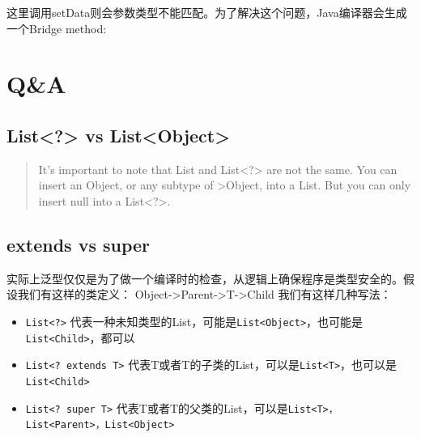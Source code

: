 \documentclass[12pt]{article}
\begin{document}
这里调用setData则会参数类型不能匹配。为了解决这个问题，Java编译器会生成一个Bridge method:

\begin{Shaded}
\begin{Highlighting}[]
  \OperatorTok{(}\OperatorTok{)} \OperatorTok{\{}
    \OperatorTok{((}\OperatorTok{)}\OperatorTok{);}
\OperatorTok{\}}
\end{Highlighting}
\end{Shaded}

\section{Q\&A}\label{qa}

\subsection{List\textless?\textgreater{} vs List\textless Object\textgreater{}}\label{list-vs-listobject}

\begin{quote}
It's important to note that List and List\textless?\textgreater{} are not the same. You can insert an Object, or any subtype of \textgreater Object, into a List. But you can only insert null into a List\textless?\textgreater.
\end{quote}

\subsection{extends vs super}\label{extends-vs-super}

实际上泛型仅仅是为了做一个编译时的检查，从逻辑上确保程序是类型安全的。假设我们有这样的类定义： Object-\textgreater Parent-\textgreater T-\textgreater Child 我们有这样几种写法：

\begin{itemize}
\tightlist
\item
  \texttt{List\textless{}?\textgreater{}} 代表一种未知类型的List，可能是\texttt{List\textless{}Object\textgreater{}}，也可能是\texttt{List\textless{}Child\textgreater{}}，都可以
\item
  \texttt{List\textless{}?\ extends\ T\textgreater{}} 代表T或者T的子类的List，可以是\texttt{List\textless{}T\textgreater{}}，也可以是\texttt{List\textless{}Child\textgreater{}}
\item
  \texttt{List\textless{}?\ super\ T\textgreater{}} 代表T或者T的父类的List，可以是\texttt{List\textless{}T\textgreater{}，List\textless{}Parent\textgreater{}，List\textless{}Object\textgreater{}}
\end{itemize}
\end{document}
